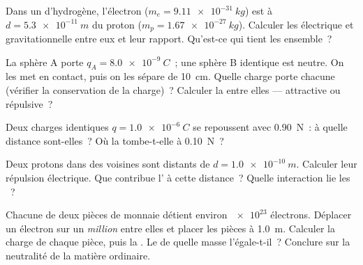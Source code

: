 \begin{exercise}[$\star\star$]\label{exo:g11:fundamental-interactions:7}
Dans un  d'hydrogène, l'électron
($m_e = \qty{9.11e-31}{kg}$) est à $d = \qty{5.3e-11}{m}$ du proton
($m_p = \qty{1.67e-27}{kg}$). Calculer les
 électrique et gravitationnelle entre
eux et leur rapport. Qu'est-ce qui tient les
 ensemble~?
\end{exercise}

\begin{exercise}[$\star\star$]\label{exo:g11:fundamental-interactions:8}
La sphère A porte $q_A = \qty{+8.0e-9}{C}$~; une sphère B identique est
neutre. On les met en contact, puis on les sépare de \qty{10}{cm}.
Quelle charge porte chacune (vérifier la conservation de la charge)~?
Calculer la  entre elles --- attractive
ou répulsive~?
\end{exercise}

\begin{exercise}[$\star\star$]\label{exo:g11:fundamental-interactions:9}
Deux charges identiques $q = \qty{1.0e-6}{C}$ se repoussent avec
\qty{0.90}{N}~: à quelle distance sont-elles~? Où la
 tombe-t-elle à \qty{0.10}{N}~?
\end{exercise}

\begin{exercise}[$\star\star$]\label{exo:g11:fundamental-interactions:10}
Deux protons dans des  voisines
sont distants de $d = \qty{1.0e-10}{m}$. Calculer leur répulsion
électrique. Que contribue l' à cette distance~? Quelle interaction lie les
~?
\end{exercise}

\begin{exercise}[$\star\star$]\label{exo:g11:fundamental-interactions:11}
Chacune de deux pièces de monnaie détient environ $\num{e23}$
électrons. Déplacer un électron sur un \emph{million} entre elles et
placer les pièces à \qty{1.0}{m}. Calculer la charge de chaque pièce,
puis la . Le
 de quelle masse l'égale-t-il~?
Conclure sur la neutralité de la matière ordinaire.
\end{exercise}

